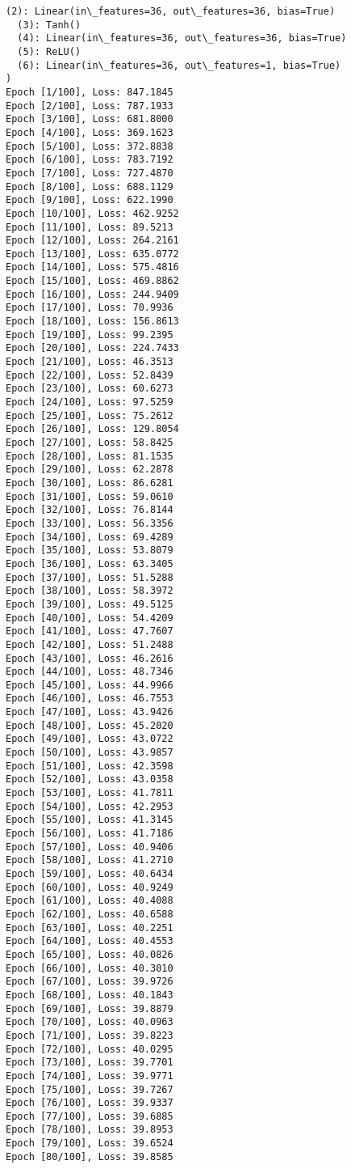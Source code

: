 \documentclass[11pt]{article}
\begin{document}
\begin{Verbatim}[commandchars=\\\{\}]
  (2): Linear(in\_features=36, out\_features=36, bias=True)
  (3): Tanh()
  (4): Linear(in\_features=36, out\_features=36, bias=True)
  (5): ReLU()
  (6): Linear(in\_features=36, out\_features=1, bias=True)
)
Epoch [1/100], Loss: 847.1845
Epoch [2/100], Loss: 787.1933
Epoch [3/100], Loss: 681.8000
Epoch [4/100], Loss: 369.1623
Epoch [5/100], Loss: 372.8838
Epoch [6/100], Loss: 783.7192
Epoch [7/100], Loss: 727.4870
Epoch [8/100], Loss: 688.1129
Epoch [9/100], Loss: 622.1990
Epoch [10/100], Loss: 462.9252
Epoch [11/100], Loss: 89.5213
Epoch [12/100], Loss: 264.2161
Epoch [13/100], Loss: 635.0772
Epoch [14/100], Loss: 575.4816
Epoch [15/100], Loss: 469.8862
Epoch [16/100], Loss: 244.9409
Epoch [17/100], Loss: 70.9936
Epoch [18/100], Loss: 156.8613
Epoch [19/100], Loss: 99.2395
Epoch [20/100], Loss: 224.7433
Epoch [21/100], Loss: 46.3513
Epoch [22/100], Loss: 52.8439
Epoch [23/100], Loss: 60.6273
Epoch [24/100], Loss: 97.5259
Epoch [25/100], Loss: 75.2612
Epoch [26/100], Loss: 129.8054
Epoch [27/100], Loss: 58.8425
Epoch [28/100], Loss: 81.1535
Epoch [29/100], Loss: 62.2878
Epoch [30/100], Loss: 86.6281
Epoch [31/100], Loss: 59.0610
Epoch [32/100], Loss: 76.8144
Epoch [33/100], Loss: 56.3356
Epoch [34/100], Loss: 69.4289
Epoch [35/100], Loss: 53.8079
Epoch [36/100], Loss: 63.3405
Epoch [37/100], Loss: 51.5288
Epoch [38/100], Loss: 58.3972
Epoch [39/100], Loss: 49.5125
Epoch [40/100], Loss: 54.4209
Epoch [41/100], Loss: 47.7607
Epoch [42/100], Loss: 51.2488
Epoch [43/100], Loss: 46.2616
Epoch [44/100], Loss: 48.7346
Epoch [45/100], Loss: 44.9966
Epoch [46/100], Loss: 46.7553
Epoch [47/100], Loss: 43.9426
Epoch [48/100], Loss: 45.2020
Epoch [49/100], Loss: 43.0722
Epoch [50/100], Loss: 43.9857
Epoch [51/100], Loss: 42.3598
Epoch [52/100], Loss: 43.0358
Epoch [53/100], Loss: 41.7811
Epoch [54/100], Loss: 42.2953
Epoch [55/100], Loss: 41.3145
Epoch [56/100], Loss: 41.7186
Epoch [57/100], Loss: 40.9406
Epoch [58/100], Loss: 41.2710
Epoch [59/100], Loss: 40.6434
Epoch [60/100], Loss: 40.9249
Epoch [61/100], Loss: 40.4088
Epoch [62/100], Loss: 40.6588
Epoch [63/100], Loss: 40.2251
Epoch [64/100], Loss: 40.4553
Epoch [65/100], Loss: 40.0826
Epoch [66/100], Loss: 40.3010
Epoch [67/100], Loss: 39.9726
Epoch [68/100], Loss: 40.1843
Epoch [69/100], Loss: 39.8879
Epoch [70/100], Loss: 40.0963
Epoch [71/100], Loss: 39.8223
Epoch [72/100], Loss: 40.0295
Epoch [73/100], Loss: 39.7701
Epoch [74/100], Loss: 39.9771
Epoch [75/100], Loss: 39.7267
Epoch [76/100], Loss: 39.9337
Epoch [77/100], Loss: 39.6885
Epoch [78/100], Loss: 39.8953
Epoch [79/100], Loss: 39.6524
Epoch [80/100], Loss: 39.8585

\end{Verbatim}
\end{document}
